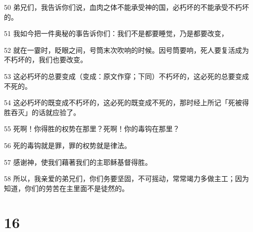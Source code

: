 \par 50 弟兄们，我告诉你们说，血肉之体不能承受神的国，必朽坏的不能承受不朽坏的。
\par 51 我如今把一件奥秘的事告诉你们：我们不是都要睡觉，乃是都要改变，
\par 52 就在一霎时，眨眼之间，号筒末次吹响的时候。因号筒要响，死人要复活成为不朽坏的，我们也要改变。
\par 53 这必朽坏的总要变成（变成：原文作穿；下同）不朽坏的，这必死的总要变成不死的。
\par 54 这必朽坏的既变成不朽坏的，这必死的既变成不死的，那时经上所记「死被得胜吞灭」的话就应验了。
\par 55 死啊！你得胜的权势在那里？死啊！你的毒钩在那里？
\par 56 死的毒钩就是罪，罪的权势就是律法。
\par 57 感谢神，使我们藉著我们的主耶稣基督得胜。
\par 58 所以，我亲爱的弟兄们，你们务要坚固，不可摇动，常常竭力多做主工；因为知道，你们的劳苦在主里面不是徒然的。

\chapter{16}

